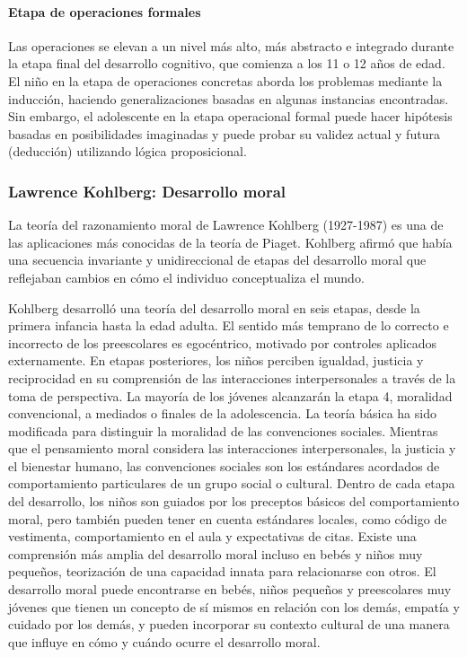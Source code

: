 \documentclass[11pt,letterpaper]{report}
\begin{document}
\paragraph{Etapa de operaciones formales}
Las operaciones se elevan a un nivel más alto, más abstracto e integrado
durante la etapa final del desarrollo cognitivo, que comienza a los 11 o 12
años de edad. El niño en la etapa de operaciones concretas aborda los problemas
mediante la inducción, haciendo generalizaciones basadas en algunas instancias
encontradas. Sin embargo, el adolescente en la etapa operacional formal puede
hacer hipótesis basadas en posibilidades imaginadas y puede probar su validez
actual y futura (deducción) utilizando lógica proposicional. \cite{Feldman3}

\subsubsection{Lawrence Kohlberg: Desarrollo moral}
La teoría del razonamiento moral de Lawrence Kohlberg (1927-1987) es una de las
aplicaciones más conocidas de la teoría de Piaget. Kohlberg afirmó que había
una secuencia invariante y unidireccional de etapas del desarrollo moral que
reflejaban cambios en cómo el individuo conceptualiza el mundo. \cite{Feldman3}

Kohlberg desarrolló una teoría del desarrollo moral en seis etapas, desde la
primera infancia hasta la edad adulta. El sentido más temprano de lo correcto e
incorrecto de los preescolares es egocéntrico, motivado por controles aplicados
externamente. En etapas posteriores, los niños perciben igualdad, justicia y
reciprocidad en su comprensión de las interacciones interpersonales a través de
la toma de perspectiva. La mayoría de los jóvenes alcanzarán la etapa 4,
moralidad convencional, a mediados o finales de la adolescencia. La teoría
básica ha sido modificada para distinguir la moralidad de las convenciones
sociales. Mientras que el pensamiento moral considera las interacciones
interpersonales, la justicia y el bienestar humano, las convenciones sociales
son los estándares acordados de comportamiento particulares de un grupo social
o cultural. Dentro de cada etapa del desarrollo, los niños son guiados por los
preceptos básicos del comportamiento moral, pero también pueden tener en cuenta
estándares locales, como código de vestimenta, comportamiento en el aula y
expectativas de citas. Existe una comprensión más amplia del desarrollo moral
incluso en bebés y niños muy pequeños, teorización de una capacidad innata para
relacionarse con otros. El desarrollo moral puede encontrarse en bebés,
niños pequeños y preescolares muy jóvenes que tienen un concepto de sí mismos
en relación con los demás, empatía y cuidado por los demás, y pueden incorporar
su contexto cultural de una manera que influye en cómo y cuándo ocurre el
desarrollo moral. \cite{Nelson19}
\end{document}
